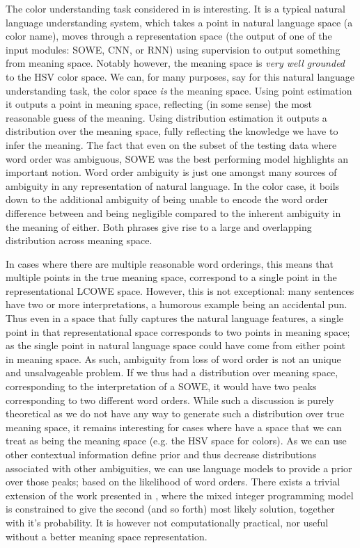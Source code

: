 \documentclass{book}
\begin{document}
The color understanding task considered in  is interesting.
It is a typical natural language understanding system,
which takes a point in natural language space (a color name),
moves through a representation space (the output of one of the input modules: SOWE, CNN, or RNN) using supervision to output something from meaning space.
Notably however, the meaning space is \emph{very well grounded} to the HSV color space.
We can, for many purposes, say for this natural language understanding task, the color space \emph{is} the meaning space.
Using point estimation it outputs a point in meaning space, reflecting (in some sense) the most reasonable guess of the meaning.
Using distribution estimation it outputs a distribution over the meaning space, fully reflecting the knowledge we have to infer the meaning.
The fact that even on the subset of the testing data where word order was ambiguous, SOWE was the best performing model highlights an important notion.
Word order ambiguity is just one amongst many sources of ambiguity in any representation of natural language.
In the color case, it boils down to the additional ambiguity of being unable to encode the word order difference between  and  being negligible compared to the inherent ambiguity in the meaning of either.
Both phrases give rise to a large and overlapping distribution across meaning space.

In cases where there are multiple reasonable word orderings,
this means that multiple points in the true meaning space, correspond to a single point in the representational LCOWE space.
However, this is not exceptional: 
many sentences have two or more interpretations, a humorous example being an accidental pun.
Thus even in a space that fully captures the natural language features,  a single point in that representational space
corresponds to two points in meaning space;
as the single point in natural language space could have come from either point in meaning space.
As such, ambiguity from loss of word order is not an unique and unsalvageable problem.
If we thus had a distribution over meaning space, corresponding to the interpretation of a SOWE, it would have two peaks corresponding to two different word orders.
While such a discussion is purely theoretical as we do not have any way to generate such a distribution over true meaning space,
it remains interesting for cases where have a space that we can treat as being the meaning space (e.g. the HSV space for colors).
As we can use other contextual information define prior and thus decrease distributions associated with other ambiguities,
we can use language models to provide a prior over those peaks; based on the likelihood of word orders.
There exists a trivial extension of the work presented in , where the mixed integer programming model is constrained to give the second (and so forth) most likely solution, together with it's probability.
It is however not computationally practical, nor useful without a better meaning space representation.
\end{document}
